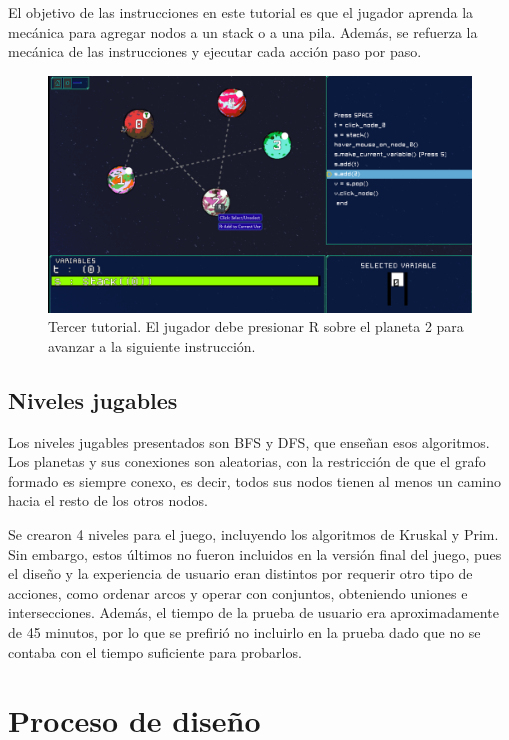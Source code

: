 El objetivo de las instrucciones en este tutorial es que el jugador aprenda la mecánica para agregar nodos a un stack o a una pila. Además, se refuerza la mecánica de las instrucciones y ejecutar cada acción paso por paso.


\begin{figure}[h]
	\centering
	\includegraphics[scale=0.3]{imagenes/ThirdTutorialAddingNode.png}
	\caption{Tercer tutorial. El jugador debe presionar R sobre el planeta 2 para avanzar a la siguiente instrucción.}
	\label{ThirdTutorialAddingNodesToStacks}
\end{figure}


\subsection{Niveles jugables}

Los niveles jugables presentados son BFS y DFS, que enseñan esos algoritmos. Los planetas y sus conexiones son aleatorias, con la restricción de que el grafo formado es siempre conexo, es decir, todos sus nodos tienen al menos un camino hacia el resto de los otros nodos.

Se crearon 4 niveles para el juego, incluyendo los algoritmos de Kruskal y Prim. Sin embargo, estos últimos no fueron incluidos en la versión final del juego, pues el diseño y la experiencia de usuario eran distintos por requerir otro tipo de acciones, como ordenar arcos y operar con conjuntos, obteniendo uniones e intersecciones. Además, el tiempo de la prueba de usuario era aproximadamente de 45 minutos, por lo que se prefirió no incluirlo en la prueba dado que no se contaba con el tiempo suficiente para probarlos.


\section{Proceso de diseño}

